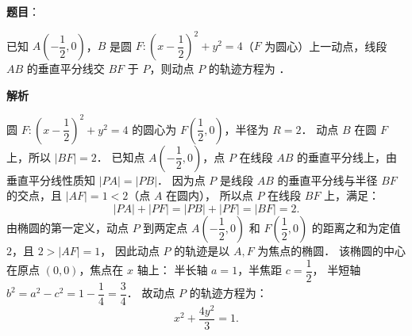 \begin{answer}

\textbf{题目}：

已知 $A\left(-\dfrac{1}{2}, 0\right)$，$B$ 是圆 $F: \left(x - \dfrac{1}{2}\right)^2 + y^2 = 4$（$F$ 为圆心）上一动点，线段 $AB$ 的垂直平分线交 $BF$ 于 $P$，则动点 $P$ 的轨迹方程为 \underline{\hspace{2cm}}．

\textbf{解析}

圆 $F: \left(x - \dfrac{1}{2}\right)^2 + y^2 = 4$ 的圆心为 $F\left(\dfrac{1}{2}, 0\right)$，半径为 $R = 2$．
动点 $B$ 在圆 $F$ 上，所以 $|BF| = 2$．
已知点 $A\left(-\dfrac{1}{2}, 0\right)$，点 $P$ 在线段 $AB$ 的垂直平分线上，由垂直平分线性质知 $|PA| = |PB|$．
因为点 $P$ 是线段 $AB$ 的垂直平分线与半径 $BF$ 的交点，且 $|AF| = 1 < 2$（点 $A$ 在圆内），
所以点 $P$ 在线段 $BF$ 上，满足：
\nopagebreak[4]
\[
|PA| + |PF| = |PB| + |PF| = |BF| = 2.
\]
由椭圆的第一定义，动点 $P$ 到两定点 $A\left(-\dfrac{1}{2}, 0\right)$ 和 $F\left(\dfrac{1}{2}, 0\right)$ 的距离之和为定值 $2$，且 $2 > |AF| = 1$，
因此动点 $P$ 的轨迹是以 $A, F$ 为焦点的椭圆．
该椭圆的中心在原点 $(0, 0)$，焦点在 $x$ 轴上：
半长轴 $a = 1$，半焦距 $c = \dfrac{1}{2}$，
半短轴 $b^2 = a^2 - c^2 = 1 - \dfrac{1}{4} = \dfrac{3}{4}$．
故动点 $P$ 的轨迹方程为：
\nopagebreak[4]
\[
x^2 + \frac{4y^2}{3} = 1.
\]


\end{answer}
